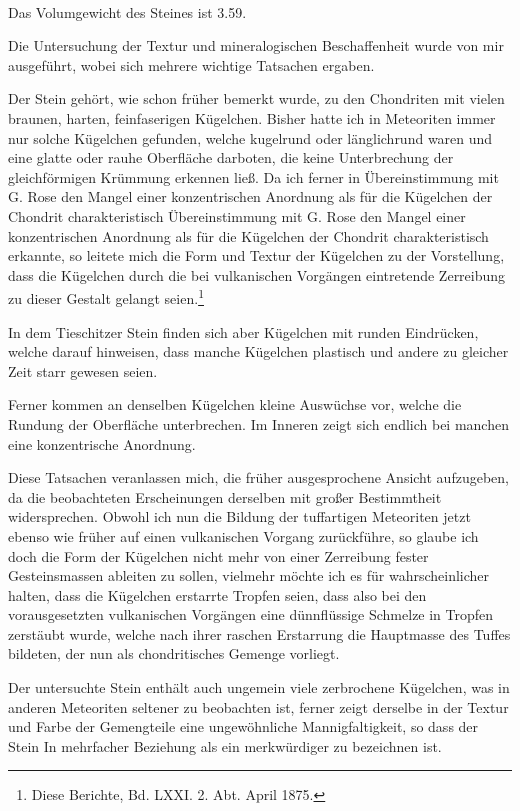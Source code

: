 \documentclass[a4paper, 11pt, oneside]{article}
\begin{document}
\paragraph{}
Das Volumgewicht des Steines ist 3.59.

Die Untersuchung der Textur und mineralogischen Beschaffenheit wurde von mir ausgeführt, wobei sich mehrere wichtige Tatsachen ergaben.

Der Stein gehört, wie schon früher bemerkt wurde, zu den Chondriten mit vielen braunen, harten, feinfaserigen Kügelchen. Bisher hatte ich in Meteoriten immer nur solche Kügelchen gefunden, welche kugelrund oder länglichrund waren und eine glatte oder rauhe Oberfläche darboten, die keine Unterbrechung der gleichförmigen Krümmung erkennen ließ. Da ich ferner in Übereinstimmung mit G. Rose den Mangel einer konzentrischen Anordnung als für die Kügelchen der Chondrit charakteristisch Übereinstimmung mit G. Rose den Mangel einer konzentrischen Anordnung als für die Kügelchen der Chondrit charakteristisch erkannte, so leitete mich die Form und Textur der Kügelchen zu der Vorstellung, dass die Kügelchen durch die bei vulkanischen Vorgängen eintretende Zerreibung zu dieser Gestalt gelangt seien.\footnote{Diese Berichte, Bd. LXXI. 2. Abt. April 1875.}

In dem Tieschitzer Stein finden sich aber Kügelchen mit runden Eindrücken, welche darauf hinweisen, dass manche Kügelchen plastisch und andere zu gleicher Zeit starr gewesen seien.

Ferner kommen an denselben Kügelchen kleine Auswüchse vor, welche die Rundung der Oberfläche unterbrechen. Im Inneren zeigt sich endlich bei manchen eine konzentrische Anordnung.

Diese Tatsachen veranlassen mich, die früher ausgesprochene Ansicht aufzugeben, da die beobachteten Erscheinungen derselben mit großer Bestimmtheit widersprechen. Obwohl ich nun die Bildung der tuffartigen Meteoriten jetzt ebenso wie früher auf einen vulkanischen Vorgang zurückführe, so glaube ich doch die Form der Kügelchen nicht mehr von einer Zerreibung fester Gesteinsmassen ableiten zu sollen, vielmehr möchte ich es für wahrscheinlicher halten, dass die Kügelchen erstarrte Tropfen seien, dass also bei den vorausgesetzten vulkanischen Vorgängen eine dünnflüssige Schmelze in Tropfen zerstäubt wurde, welche nach ihrer raschen Erstarrung die Hauptmasse des Tuffes bildeten, der nun als chondritisches Gemenge vorliegt.

Der untersuchte Stein enthält auch ungemein viele zerbrochene Kügelchen, was in anderen Meteoriten seltener zu beobachten ist, ferner zeigt derselbe in der Textur und Farbe der Gemengteile eine ungewöhnliche Mannigfaltigkeit, so dass der Stein In mehrfacher Beziehung als ein merkwürdiger zu bezeichnen ist.
\end{document}
